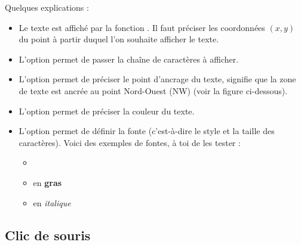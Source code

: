 \documentclass[11pt,class=report,crop=false]{standalone}
\begin{document}
Quelques explications :
\begin{itemize}
%  
  
  \item Le texte est affiché par la fonction . Il faut préciser les coordonnées $(x,y)$ du point à partir duquel l'on souhaite afficher le texte. 
  
  \item L'option  permet de passer la chaîne de caractères à afficher.
  
  \item L'option  permet de préciser le point d'ancrage du texte,  signifie que la zone de texte est ancrée au point Nord-Ouest (NW) (voir la figure ci-dessous).
  
  \item L'option  permet de préciser la couleur du texte.
  
  \item L'option  permet de définir la fonte (c'est-à-dire le style et la taille des caractères). Voici des exemples de fontes, à toi de les tester :
  \begin{itemize}
    \item {} 
    \item {} en \textbf{gras}
    \item {} en \emph{italique}
  \end{itemize}  
\end{itemize}



\subsection{Clic de souris}
\end{document}
